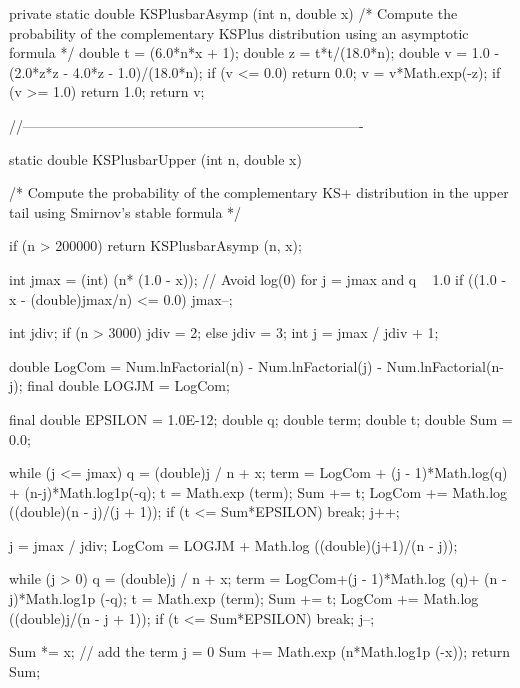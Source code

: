\begin{code}\begin{hide}

   private static double KSPlusbarAsymp (int n, double x) {
      /* Compute the probability of the complementary KSPlus distribution
         using an asymptotic formula */
      double t = (6.0*n*x + 1);
      double z = t*t/(18.0*n);
      double v = 1.0 - (2.0*z*z - 4.0*z - 1.0)/(18.0*n);
      if (v <= 0.0)
         return 0.0;
      v = v*Math.exp(-z);
      if (v >= 1.0)
         return 1.0;
      return v;
   }


//-------------------------------------------------------------------------

   static double KSPlusbarUpper (int n, double x) {
      /* Compute the probability of the complementary KS+ distribution in
         the upper tail using Smirnov's stable formula */

      if (n > 200000)
         return KSPlusbarAsymp (n, x);

      int jmax = (int) (n* (1.0 - x));
      // Avoid log(0) for j = jmax and q ~ 1.0
      if ((1.0 - x - (double)jmax/n) <= 0.0)
         jmax--;

      int jdiv;
      if (n > 3000)
         jdiv = 2;
      else
         jdiv = 3;
      int j = jmax / jdiv + 1;

      double LogCom = Num.lnFactorial(n) - Num.lnFactorial(j)
                      - Num.lnFactorial(n-j);
      final double LOGJM = LogCom;

      final double EPSILON = 1.0E-12;
      double q;
      double term;
      double t;
      double Sum = 0.0;

      while (j <= jmax) {
         q = (double)j / n + x;
         term = LogCom + (j - 1)*Math.log(q) + (n-j)*Math.log1p(-q);
         t = Math.exp (term);
         Sum += t;
         LogCom += Math.log ((double)(n - j)/(j + 1));
         if (t <= Sum*EPSILON)
            break;
         j++;
      }

      j = jmax / jdiv;
      LogCom = LOGJM + Math.log ((double)(j+1)/(n - j));

      while (j > 0) {
         q = (double)j / n + x;
         term = LogCom+(j - 1)*Math.log (q)+ (n - j)*Math.log1p (-q);
         t = Math.exp (term);
         Sum += t;
         LogCom += Math.log ((double)j/(n - j + 1));
         if (t <= Sum*EPSILON)
            break;
         j--;
      }

      Sum *= x;
      // add the term j = 0
      Sum += Math.exp (n*Math.log1p (-x));
      return Sum;
   }\end{hide}


\end{code}
